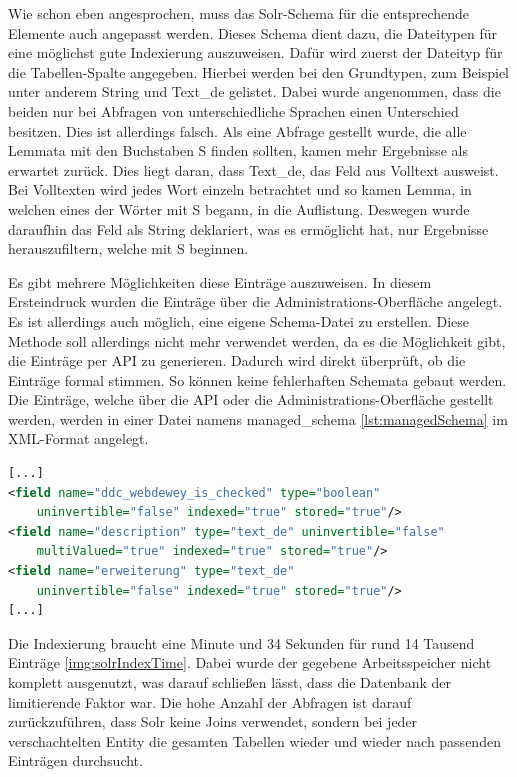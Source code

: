 Wie schon eben angesprochen, muss das Solr-Schema für die entsprechende Elemente auch angepasst werden. Dieses Schema dient dazu, die Dateitypen für eine möglichst gute Indexierung auszuweisen. Dafür wird zuerst der Dateityp für die Tabellen-Spalte angegeben. Hierbei werden bei den Grundtypen, zum Beispiel unter anderem String und Text\_de gelistet. Dabei wurde angenommen, dass die beiden nur bei Abfragen von unterschiedliche Sprachen einen Unterschied besitzen. Dies ist allerdings falsch. Als eine Abfrage gestellt wurde, die alle Lemmata mit den Buchstaben S finden sollten, kamen mehr Ergebnisse als erwartet zurück. Dies liegt daran, dass Text\_de, das Feld aus Volltext ausweist. 
Bei Volltexten wird jedes Wort einzeln betrachtet und so kamen Lemma, in welchen eines der Wörter mit S begann, in die Auflistung. Deswegen wurde daraufhin das Feld als String deklariert, was es ermöglicht hat, nur Ergebnisse herauszufiltern, welche mit S beginnen.

Es gibt mehrere Möglichkeiten diese Einträge auszuweisen. In diesem Ersteindruck wurden die Einträge über die Administrations-Oberfläche angelegt. Es ist allerdings auch möglich, eine eigene Schema-Datei zu erstellen. Diese Methode soll allerdings nicht mehr verwendet werden, da es die Möglichkeit gibt, die Einträge per API zu generieren. Dadurch wird direkt überprüft, ob die Einträge formal stimmen. So können keine fehlerhaften Schemata gebaut werden. Die Einträge, welche über die API oder die Administrations-Oberfläche gestellt werden, werden in einer Datei namens managed\_schema \ref{lst:managedSchema} im XML-Format angelegt.


\begin{lstlisting}[language=xml, frame=single, label={lst:managedSchema}, 
    morekeywords={type,uninvertible,indexed,stored,field,multiValued, name},  caption=Auschnitt auf dem managed\_schema,captionpos=b] 
[...]
<field name="ddc_webdewey_is_checked" type="boolean" 
    uninvertible="false" indexed="true" stored="true"/>
<field name="description" type="text_de" uninvertible="false" 
    multiValued="true" indexed="true" stored="true"/>
<field name="erweiterung" type="text_de" 
    uninvertible="false" indexed="true" stored="true"/>
[...]
\end{lstlisting}

Die Indexierung braucht eine Minute und 34 Sekunden für rund 14 Tausend Einträge \ref{img:solrIndexTime}. Dabei wurde der gegebene Arbeitsspeicher nicht komplett ausgenutzt, was darauf schließen lässt, dass die Datenbank der limitierende Faktor war. Die hohe Anzahl der Abfragen ist darauf zurückzuführen, dass Solr keine Joins verwendet, sondern bei jeder verschachtelten Entity die gesamten Tabellen wieder und wieder nach passenden Einträgen durchsucht.

